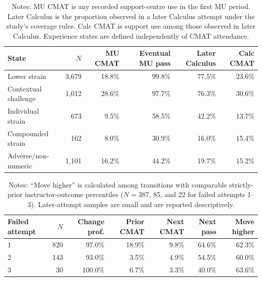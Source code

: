 \begin{landscape}
\begin{table}[p]
\centering
\small
\caption{Primary first-MU experience states and subsequent outcomes}
\label{tab:states}
\begin{tabular}{@{}lrrrrr@{}}
\toprule
State & $N$ & MU CMAT & Eventual MU pass & Later Calculus & Calc CMAT \\
\midrule
Lower strain & 3,679 & 18.8\% & 99.8\% & 77.5\% & 23.6\% \\
Contextual challenge & 1,012 & 28.6\% & 97.7\% & 76.3\% & 30.6\% \\
Individual strain & 673 & 9.5\% & 58.5\% & 42.2\% & 13.7\% \\
Compounded strain & 162 & 8.0\% & 30.9\% & 16.0\% & 15.4\% \\
Adverse/non-numeric & 1,101 & 16.2\% & 44.2\% & 19.7\% & 15.2\% \\
\bottomrule
\end{tabular}
\caption*{\footnotesize Notes: MU CMAT is any recorded support-centre use in the first MU period. Later Calculus is the proportion observed in a later Calculus attempt under the study's coverage rules. Calc CMAT is support use among those observed in later Calculus. Experience states are defined independently of CMAT attendance.}
\end{table}
\end{landscape}

\begin{landscape}
\begin{table}[p]
\centering
\small
\caption{Observed adaptation after failed MU attempts}
\label{tab:failure}
\begin{tabular}{@{}lrrrrrr@{}}
\toprule
Failed attempt & $N$ & Change prof. & Prior CMAT & Next CMAT & Next pass & Move higher \\
\midrule
1 & 820 & 97.0\% & 18.9\% & 9.8\% & 64.6\% & 62.3\% \\
2 & 143 & 93.0\% & 3.5\% & 4.9\% & 54.5\% & 60.0\% \\
3 & 30 & 100.0\% & 6.7\% & 3.3\% & 40.0\% & 63.6\% \\
\bottomrule
\end{tabular}
\caption*{\footnotesize Notes: ``Move higher'' is calculated among transitions with comparable strictly-prior instructor-outcome percentiles ($N=387$, 85, and 22 for failed attempts 1--3). Later-attempt samples are small and are reported descriptively.}
\end{table}
\end{landscape}

